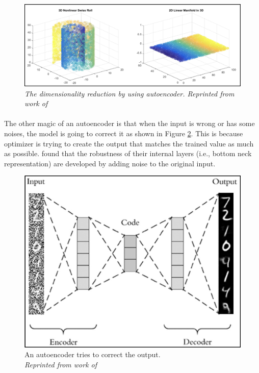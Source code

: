 \begin{figure}[H]
  \centering
  \caption[The dimensionality reduction by using autoencoder.]{\emph{The dimensionality reduction by using autoencoder.  
  Reprinted from work of \citeauthor{the_swiss_roll_2015} \citeyear{the_swiss_roll_2015}}}\label{fig:ae_f_reduction}
  \includegraphics[scale = 0.2]{figures/ae_f_reduction.jpg}  
\end{figure}


\paragraph{}
The other magic of an autoencoder is that when the input is wrong or has some noises, the model is going to correct it as shown in Figure \ref{fig:ae_2}. This is because optimizer is trying to create the output that matches the trained value as much as possible. \citeauthor{vincent_larochelle_bengio_manzagol_2008} \citeyear{vincent_larochelle_bengio_manzagol_2008} found that the robustness of their internal layers (i.e., bottom neck representation) are developed by adding noise to the original input.


\begin{figure}[H]
  \centering
  \caption[An autoencoder tries to correct the output.]{An autoencoder tries to correct the output. \\\hspace{\textwidth}
  \emph{Reprinted from work of \citeauthor{rosebrock_2020} \citeyear{rosebrock_2020}}}\label{fig:ae_2}
  \includegraphics[scale = 0.4]{figures/ae_2.jpg}  
\end{figure}

